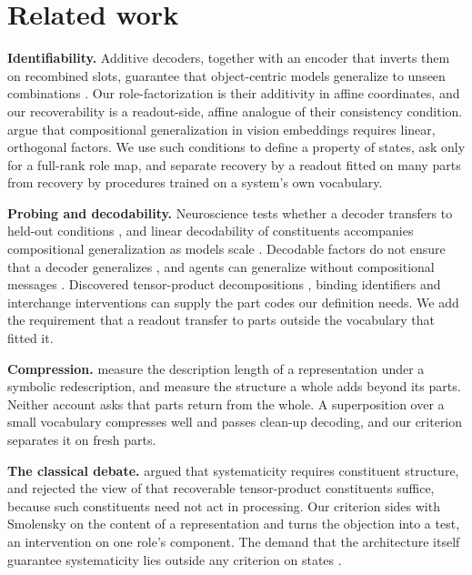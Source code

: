 \documentclass[10pt]{article}
\theoremstyle{plain}
\theoremstyle{remark}
\begin{document}
\section{Related work}
\label{sec:related}

\textbf{Identifiability.} Additive decoders, together with an encoder that inverts them on recombined slots, guarantee that object-centric models generalize to unseen combinations \citep{brady2023,lachapelle2023,wiedemer2024}. Our role-factorization is their additivity in affine coordinates, and our recoverability is a readout-side, affine analogue of their consistency condition. \citet{uselis2026} argue that compositional generalization in vision embeddings requires linear, orthogonal factors. We use such conditions to define a property of states, ask only for a full-rank role map, and separate recovery by a readout fitted on many parts from recovery by procedures trained on a system's own vocabulary.

\textbf{Probing and decodability.} Neuroscience tests whether a decoder transfers to held-out conditions \citep{bernardi2020}, and linear decodability of constituents accompanies compositional generalization as models scale \citep{redhardt2025}. Decodable factors do not ensure that a decoder generalizes \citep{montero2021,schott2022}, and agents can generalize without compositional messages \citep{chaabouni2020}. Discovered tensor-product decompositions \citep{mccoy2019,soulos2020}, binding identifiers \citep{feng2024} and interchange interventions \citep{geiger2021,geiger2024das} can supply the part codes our definition needs. We add the requirement that a readout transfer to parts outside the vocabulary that fitted it.

\textbf{Compression.} \citet{elmoznino2024} measure the description length of a representation under a symbolic redescription, and \citet{elmoznino2026} measure the structure a whole adds beyond its parts. Neither account asks that parts return from the whole. A superposition over a small vocabulary compresses well and passes clean-up decoding, and our criterion separates it on fresh parts.

\textbf{The classical debate.} \citet{fodor1988} argued that systematicity requires constituent structure, and \citet{fodor1990} rejected the view of \citet{smolensky1990} that recoverable tensor-product constituents suffice, because such constituents need not act in processing. Our criterion sides with Smolensky on the content of a representation and turns the objection into a test, an intervention on one role's component. The demand that the architecture itself guarantee systematicity lies outside any criterion on states \citep{russin2024,goodale2026}.
\end{document}
